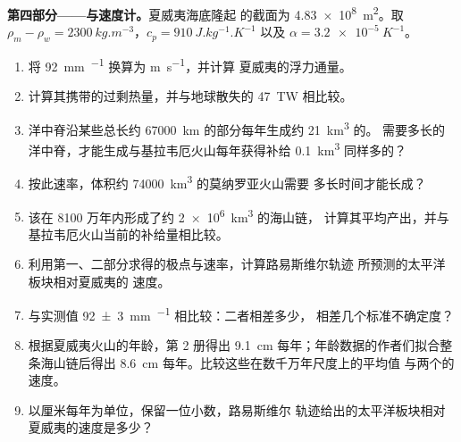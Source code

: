 \begin{problem}
\medskip
\noindent\textbf{第四部分——与速度计。}夏威夷海底隆起
的截面为 \qty{4.83e8}{m^2}。取
$\rho_m - \rho_w = \qty{2300}{kg.m^{-3}}$，$c_p = \qty{910}{J.kg^{-1}.K^{-1}}$
以及 $\alpha = \qty{3.2e-5}{K^{-1}}$。
\begin{enumerate}[resume]
  \item 将 \qty{92}{mm.^{-1}} 换算为 \unit{m.s^{-1}}，并计算
        夏威夷的浮力通量。
  \item 计算其携带的过剩热量，并与地球散失的
        \qty{47}{TW} 相比较。
  \item 洋中脊沿某些总长约
        \qty{67000}{km} 的部分每年生成约 \qty{21}{km^3} 的。
        需要多长的洋中脊，才能生成与基拉韦厄火山每年获得补给 \qty{0.1}{km^3} 同样多的？
  \item 按此速率，体积约 \qty{74000}{km^3} 的莫纳罗亚火山需要
        多长时间才能长成？
  \item 该在 8100 万年内形成了约 \qty{2e6}{km^3} 的海山链，
        计算其平均产出，并与基拉韦厄火山当前的补给量相比较。
  \item 利用第一、二部分求得的极点与速率，计算路易斯维尔轨迹
        所预测的太平洋板块相对夏威夷的
        速度。
  \item 与实测值 \qty[uncertainty-mode=separate]{92 \pm 3}{mm.^{-1}} 相比较：二者相差多少，
        相差几个标准不确定度？
  \item 根据夏威夷火山的年龄，第 2 册得出
        \qty{9.1}{cm} 每年；年龄数据的作者们拟合整条海山链后得出
        \qty{8.6}{cm} 每年。比较这些在数千万年尺度上的平均值
        与两个的速度。
  \item 以厘米每年为单位，保留一位小数，路易斯维尔
        轨迹给出的太平洋板块相对夏威夷的速度是多少？
\end{enumerate}
\end{problem}
